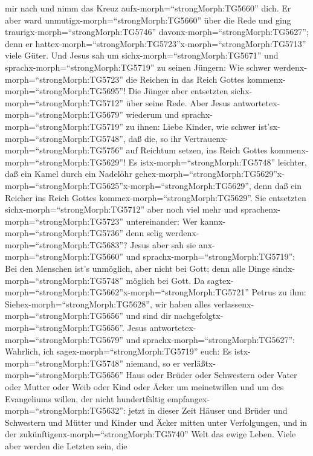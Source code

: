 mir nach und nimm das Kreuz aufx-morph=``strongMorph:TG5660'' dich.
 Er aber ward unmutigx-morph=``strongMorph:TG5660'' über
die Rede und ging traurigx-morph=``strongMorph:TG5746''
davonx-morph=``strongMorph:TG5627''; denn er
hattex-morph=``strongMorph:TG5723''x-morph=``strongMorph:TG5713'' viele
Güter.  Und Jesus sah um sichx-morph=``strongMorph:TG5671''
und sprachx-morph=``strongMorph:TG5719'' zu seinen Jüngern: Wie schwer
werdenx-morph=``strongMorph:TG5723'' die Reichen in das Reich Gottes
kommenx-morph=``strongMorph:TG5695''!  Die Jünger aber
entsetzten sichx-morph=``strongMorph:TG5712'' über seine Rede. Aber
Jesus antwortetex-morph=``strongMorph:TG5679'' wiederum und
sprachx-morph=``strongMorph:TG5719'' zu ihnen: Liebe Kinder, wie schwer
ist'sx-morph=``strongMorph:TG5748'', daß die, so ihr
Vertrauenx-morph=``strongMorph:TG5756'' auf Reichtum setzen, ins Reich
Gottes kommenx-morph=``strongMorph:TG5629''!  Es
istx-morph=``strongMorph:TG5748'' leichter, daß ein Kamel durch ein
Nadelöhr
gehex-morph=``strongMorph:TG5629''\textbar x-morph=``strongMorph:TG5625''x-morph=``strongMorph:TG5629'',
denn daß ein Reicher ins Reich Gottes
kommex-morph=``strongMorph:TG5629''.  Sie entsetzten
sichx-morph=``strongMorph:TG5712'' aber noch viel mehr und
sprachenx-morph=``strongMorph:TG5723'' untereinander: Wer
kannx-morph=``strongMorph:TG5736'' denn selig
werdenx-morph=``strongMorph:TG5683''?  Jesus aber sah sie
anx-morph=``strongMorph:TG5660'' und
sprachx-morph=``strongMorph:TG5719'': Bei den Menschen ist's unmöglich,
aber nicht bei Gott; denn alle Dinge sindx-morph=``strongMorph:TG5748''
möglich bei Gott.  Da
sagtex-morph=``strongMorph:TG5662''x-morph=``strongMorph:TG5721'' Petrus
zu ihm: Siehex-morph=``strongMorph:TG5628'', wir haben alles
verlassenx-morph=``strongMorph:TG5656'' und sind dir
nachgefolgtx-morph=``strongMorph:TG5656''.  Jesus
antwortetex-morph=``strongMorph:TG5679'' und
sprachx-morph=``strongMorph:TG5627'': Wahrlich, ich
sagex-morph=``strongMorph:TG5719'' euch: Es
istx-morph=``strongMorph:TG5748'' niemand, so er
verläßtx-morph=``strongMorph:TG5656'' Haus oder Brüder oder Schwestern
oder Vater oder Mutter oder Weib oder Kind oder Äcker um meinetwillen
und um des Evangeliums willen,  der nicht hundertfältig
empfangex-morph=``strongMorph:TG5632'': jetzt in dieser Zeit Häuser und
Brüder und Schwestern und Mütter und Kinder und Äcker mitten unter
Verfolgungen, und in der zukünftigenx-morph=``strongMorph:TG5740'' Welt
das ewige Leben.  Viele aber werden die Letzten sein, die

